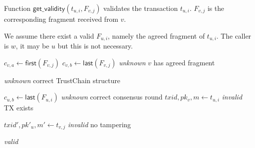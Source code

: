 \begin{algorithm}
\caption{Function $\textsf{get\_validity}(t_{u, i}, F_{v, j})$ validates the transaction $t_{u, i}$.
$F_{v, j}$ is the corresponding fragment received from $v$.}
We assume there exist a valid $F_{u, i}$, namely the agreed fragment of $t_{u, i}$. 
The caller is $w$, it may be $u$ but this is not necessary.
\label{alg:get-validity}

\begin{algorithmic}[1]


    \State $c_{v, a} \gets \textsf{first}(F_{v, j})$
    \State $c_{v, b} \gets \textsf{last}(F_{v, j})$
        \State \Return \emph{unknown}
    \EndIf \Comment $v$ has agreed fragment
    \State


            \State \Return \emph{unknown}
        \EndIf
    \EndIf \Comment correct TrustChain structure
    \State

    \State $c_{u, b} \gets \textsf{last}(F_{u, i})$
        \State \Return \emph{unknown}
    \EndIf \Comment correct consensus round
    \State
    \label{line:valid-fragment}
    \State $txid, pk_v, m \gets t_{u, i}$
        \State \Return \emph{invalid}
    \EndIf \Comment TX exists
    \State 

    \State $txid', pk'_u, m' \gets t_{v, j}$
        \State \Return \emph{invalid}
    \EndIf \Comment no tampering
    \State

    \State \Return \emph{valid}
\end{algorithmic}
\end{algorithm}

